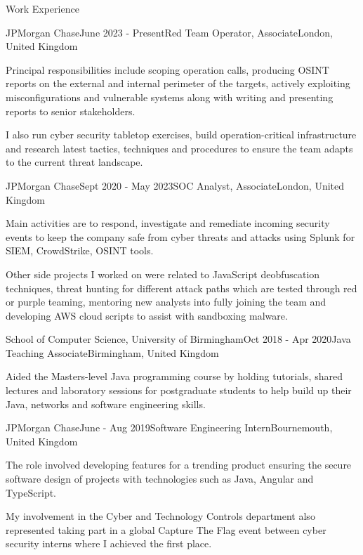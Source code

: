 \documentclass{resume} %
\begin{document}

\begin{rSection}{Work Experience}

\begin{rSubsection}{JPMorgan Chase}{June 2023 - Present}{Red Team Operator, Associate}{London, United Kingdom}
\item Principal responsibilities include scoping operation calls, producing OSINT reports on the external and internal perimeter of the targets, actively exploiting misconfigurations and vulnerable systems along with writing and presenting reports to senior stakeholders.
\item I also run cyber security tabletop exercises, build operation-critical infrastructure and research latest tactics, techniques and procedures to ensure the team adapts to the current threat landscape.
\end{rSubsection}

\begin{rSubsection}{JPMorgan Chase}{Sept 2020 - May 2023}{SOC Analyst, Associate}{London, United Kingdom}
\item Main activities are to respond, investigate and remediate incoming security events to keep the company safe from cyber threats and attacks using Splunk for SIEM, CrowdStrike, OSINT tools.
\item Other side projects I worked on were related to JavaScript deobfuscation techniques, threat hunting for different attack paths which are tested through red or purple teaming, mentoring new analysts into fully joining the team and developing AWS cloud scripts to assist with sandboxing malware.
\end{rSubsection}

\begin{rSubsection}{School of Computer Science, University of Birmingham}{Oct 2018 - Apr 2020}{Java Teaching Associate}{Birmingham, United Kingdom}
\item Aided the Masters-level Java programming course by holding tutorials, shared lectures and laboratory sessions for postgraduate students to help build up their Java, networks and software engineering skills.
\end{rSubsection}

\begin{rSubsection}{JPMorgan Chase}{June - Aug 2019}{Software Engineering Intern}{Bournemouth, United Kingdom}
\item The role involved developing features for a trending product ensuring the secure software design of projects with technologies such as Java, Angular and TypeScript.
\item My involvement in the Cyber and Technology Controls department also represented taking part in a global Capture The Flag event between cyber security interns where I achieved the first place.
\end{rSubsection}

\end{rSection}
\end{document}
